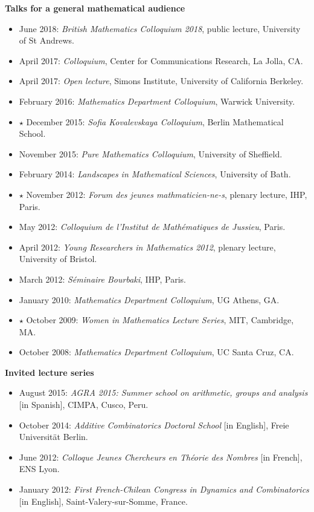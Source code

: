 \documentclass[11pt]{article}
\newenvironment{mitemize}{
\begin{itemize}
  \setlength{\itemsep}{1pt}
  \setlength{\parskip}{0pt}
  \setlength{\parsep}{0pt}
}{\end{itemize}}
\begin{document}
\newpage 
\textbf{Talks for a general mathematical audience}
\begin{mitemize}
\item June 2018: \textit{British Mathematics Colloquium 2018}, public lecture, University of St Andrews.
\item April 2017: \textit{Colloquium}, Center for Communications Research, La Jolla, CA.
\item April 2017: \textit{Open lecture}, Simons Institute, University of California Berkeley.
\item February 2016: \textit{Mathematics Department Colloquium}, Warwick University.
\item[$\star$] December 2015: \textit{Sofia Kovalevskaya Colloquium}, Berlin Mathematical School.
\item November 2015: \textit{Pure Mathematics Colloquium}, University of Sheffield.
\item February 2014: \textit{Landscapes in Mathematical Sciences}, University of Bath.
\item[$\star$] November 2012: \textit{Forum des jeunes mathmaticien-ne-s}, plenary lecture, IHP, Paris. 
\item May 2012: \textit{Colloquium de l'Institut de Math\'ematiques de Jussieu}, Paris.
\item April 2012: \textit{Young Researchers in Mathematics 2012}, plenary lecture, University of Bristol.
\item March 2012: \textit{S\'eminaire Bourbaki}, IHP, Paris.
\item January 2010: \textit{Mathematics Department Colloquium}, UG Athens, GA.
\item[$\star$] October 2009: \textit{Women in Mathematics Lecture Series}, MIT, Cambridge, MA.
\item October 2008: \textit{Mathematics Department Colloquium}, UC Santa Cruz, CA. 
\end{mitemize}

\textbf{Invited lecture series}
\begin{mitemize}
\item August 2015: \emph{AGRA 2015: Summer school on arithmetic, groups and analysis} [in Spanish], CIMPA, Cusco, Peru.
\item October 2014: \emph{Additive Combinatorics Doctoral School} [in English], Freie Universit\"at Berlin.
\item June 2012: \emph{Colloque Jeunes Chercheurs en Th\'eorie des Nombres} [in French], ENS Lyon.
\item January 2012: \emph{First French-Chilean Congress in Dynamics and Combinatorics} [in English], Saint-Valery-sur-Somme, France. 
\end{mitemize}
\end{document}
